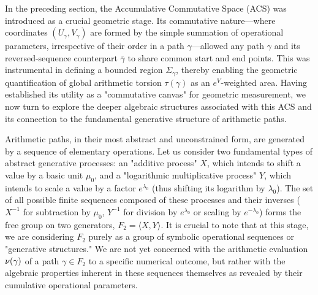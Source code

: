 In the preceding section, the Accumulative Commutative Space (ACS) was introduced as a crucial geometric stage. Its commutative nature—where coordinates $(U_\gamma, V_\gamma)$ are formed by the simple summation of operational parameters, irrespective of their order in a path $\gamma$—allowed any path $\gamma$ and its reversed-sequence counterpart $\bar{\gamma}$ to share common start and end points. This was instrumental in defining a bounded region $\Sigma_\gamma$, thereby enabling the geometric quantification of global arithmetic torsion $\tau(\gamma)$ as an $e^V$-weighted area. Having established its utility as a "commutative canvas" for geometric measurement, we now turn to explore the deeper algebraic structures associated with this ACS and its connection to the fundamental generative structure of arithmetic paths.

Arithmetic paths, in their most abstract and unconstrained form, are generated by a sequence of elementary operations. Let us consider two fundamental types of abstract generative processes: an "additive process" $X$, which intends to shift a value by a basic unit $\mu_0$, and a "logarithmic multiplicative process" $Y$, which intends to scale a value by a factor $e^{\lambda_0}$ (thus shifting its logarithm by $\lambda_0$). The set of all possible finite sequences composed of these processes and their inverses ($X^{-1}$ for subtraction by $\mu_0$, $Y^{-1}$ for division by $e^{\lambda_0}$ or scaling by $e^{-\lambda_0}$) forms the free group on two generators, $F_2 = \langle X, Y \rangle$. It is crucial to note that at this stage, we are considering $F_2$ purely as a group of symbolic operational sequences or "generative structures." We are not yet concerned with the arithmetic evaluation $\nu(\gamma)$ of a path $\gamma \in F_2$ to a specific numerical outcome, but rather with the algebraic properties inherent in these sequences themselves as revealed by their cumulative operational parameters.

